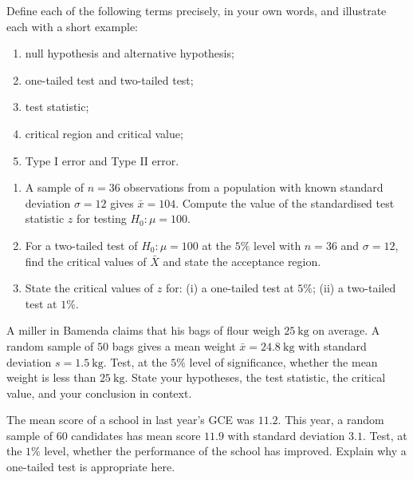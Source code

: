 \documentclass[11pt]{article}
\newcounter{popsec}
\newcounter{popsub}
\newcommand{\courssub}[1]{%
  \stepcounter{popsub}%
  \par\vspace{9pt}\noindent{\popxbold\fontsize{11.5}{13}\selectfont\color{popink}{\color{poporange}\thepopsec.\thepopsub}\hspace{6pt}#1}\par\nopagebreak\vspace{4pt}
}
\begin{document}
\begin{exercice}[Definitions]
Define each of the following terms precisely, in your own words, and illustrate each with a short example:
\begin{enumerate}
\item null hypothesis and alternative hypothesis;
\item one-tailed test and two-tailed test;
\item test statistic;
\item critical region and critical value;
\item Type I error and Type II error.
\end{enumerate}
\end{exercice}

\begin{exercice}
\begin{enumerate}
\item A sample of $n=36$ observations from a population with known standard deviation $\sigma=12$ gives $\bar{x}=104$. Compute the value of the standardised test statistic $z$ for testing $H_0:\mu=100$.
\item For a two-tailed test of $H_0:\mu=100$ at the $5\%$ level with $n=36$ and $\sigma=12$, find the critical values of $\bar{X}$ and state the acceptance region.
\item State the critical values of $z$ for: (i) a one-tailed test at $5\%$; (ii) a two-tailed test at $1\%$.
\end{enumerate}
\end{exercice}

\courssub{I practise}

\begin{exercice}
A miller in Bamenda claims that his bags of flour weigh $25\ \mathrm{kg}$ on average. A random sample of $50$ bags gives a mean weight $\bar{x}=24.8\ \mathrm{kg}$ with standard deviation $s=1.5\ \mathrm{kg}$. Test, at the $5\%$ level of significance, whether the mean weight is less than $25\ \mathrm{kg}$. State your hypotheses, the test statistic, the critical value, and your conclusion in context.
\end{exercice}

\begin{exercice}
The mean score of a school in last year's GCE was $11.2$. This year, a random sample of $60$ candidates has mean score $11.9$ with standard deviation $3.1$. Test, at the $1\%$ level, whether the performance of the school has improved. Explain why a one-tailed test is appropriate here.
\end{exercice}
\end{document}
